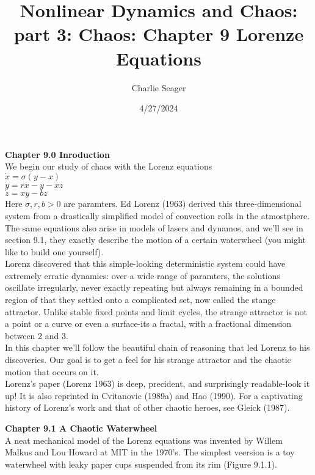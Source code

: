 \documentclass{article}
\newcommand\tab[1][1cm]{\hspace*{#1}}
\begin{document}
\title {Nonlinear Dynamics and Chaos: part 3: Chaos: Chapter 9 Lorenze Equations} 

\author{Charlie Seager}

\date{4/27/2024}

\maketitle

\textbf {Chapter 9.0 Inroduction} \\

We begin our study of chaos with the Lorenz equations \\ \tab \tab
$\dot{x}=\sigma(y-x)$ \\ \tab \tab
$\dot{y}=rx-y-xz$ \\ \tab \tab
$\dot{z}=xy-bz$ \\ 
Here $\sigma , r , b >0$ are paramters. Ed Lorenz (1963) derived this three-dimensional system from a drastically simplified model of convection rolls in the atmostphere. The same equations also arise in models of lasers and dynamos, and we'll see in section 9.1, they exactly describe the motion of a certain waterwheel (you might like to build one yourself). \\ \tab
Lorenz discovered that this simple-looking deterministic system could have extremely erratic dynamics: over a wide range of paramters, the solutions oscillate irregularly, never exactly repeating but always remaining in a bounded region of that they settled onto a complicated set, now called the stange attractor. Unlike stable fixed points and limit cycles, the strange attractor is not a point or a curve or even a surface-its a fractal, with a fractional dimension between 2 and 3. \\ \tab
In this chapter we'll follow the beautiful chain of reasoning that led Lorenz to his discoveries. Our goal is to get a feel for his strange attractor and the chaotic motion that occurs on it. \\ \tab
Lorenz's paper (Lorenz 1963) is deep, precident, and surprisingly readable-look it up! It is also reprinted in Cvitanovic (1989a) and Hao (1990). For a captivating history of Lorenz's work and that of other chaotic heroes, see Gleick (1987).

\textbf {Chapter 9.1 A Chaotic Waterwheel} \\
A neat mechanical model of the Lorenz equations was invented by Willem Malkus and Lou Howard at MIT in the 1970's. The simplest veersion is a toy waterwheel with leaky paper cups suspended from its rim (Figure 9.1.1). \\
\end{document}
